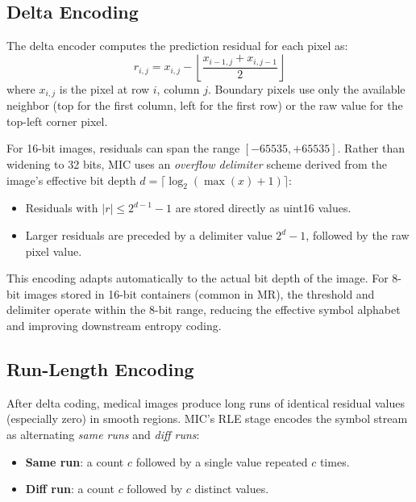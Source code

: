\documentclass[11pt,twocolumn]{article}
\begin{document}
\subsection{Delta Encoding}
\label{sec:delta}

The delta encoder computes the prediction residual for each pixel as:
\begin{equation}
    r_{i,j} = x_{i,j} - \left\lfloor \frac{x_{i-1,j} + x_{i,j-1}}{2} \right\rfloor
\end{equation}
where $x_{i,j}$ is the pixel at row $i$, column $j$.
Boundary pixels use only the available neighbor (top for the first column, left for the first row) or the raw value for the top-left corner pixel.

For 16-bit images, residuals can span the range $[-65535, +65535]$.
Rather than widening to 32 bits, MIC uses an \emph{overflow delimiter} scheme derived from the image's effective bit depth $d = \lceil\log_2(\max(x)+1)\rceil$:
\begin{itemize}[nosep]
    \item Residuals with $|r| \leq 2^{d-1} - 1$ are stored directly as uint16 values.
    \item Larger residuals are preceded by a delimiter value $2^d - 1$, followed by the raw pixel value.
\end{itemize}

This encoding adapts automatically to the actual bit depth of the image.
For 8-bit images stored in 16-bit containers (common in MR), the threshold and delimiter operate within the 8-bit range, reducing the effective symbol alphabet and improving downstream entropy coding.

\subsection{Run-Length Encoding}
\label{sec:rle}

After delta coding, medical images produce long runs of identical residual values (especially zero) in smooth regions.
MIC's RLE stage encodes the symbol stream as alternating \emph{same runs} and \emph{diff runs}:

\begin{itemize}[nosep]
    \item \textbf{Same run}: a count $c$ followed by a single value repeated $c$ times.
    \item \textbf{Diff run}: a count $c$ followed by $c$ distinct values.
\end{itemize}
\end{document}

